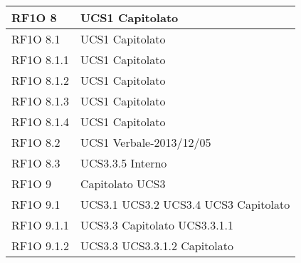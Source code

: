 \begin{center}
\begin{longtable}{ | p{5cm} | p{5cm} |}
        RF1O 8  &  UCS1 \newline  Capitolato \newline  \\ \hline      
        RF1O 8.1  &  UCS1 \newline  Capitolato \newline  \\ \hline      
        RF1O 8.1.1  &  UCS1 \newline  Capitolato \newline  \\ \hline      
        RF1O 8.1.2 &  UCS1 \newline  Capitolato \newline  \\ \hline      
        RF1O 8.1.3  &  UCS1 \newline  Capitolato \newline  \\ \hline      
        RF1O 8.1.4  &  UCS1 \newline  Capitolato \newline  \\ \hline      
        RF1O 8.2  &  UCS1 \newline  Verbale-2013/12/05 \newline  \\ \hline      
        RF1O 8.3 &  UCS3.3.5 \newline  Interno \newline  \\ \hline      
        RF1O 9  &  Capitolato \newline  UCS3 \newline  \\ \hline      
        RF1O 9.1  &  UCS3.1 \newline  UCS3.2 \newline  UCS3.4 \newline  UCS3 \newline  Capitolato \newline  \\ \hline      
        RF1O 9.1.1  &  UCS3.3 \newline  Capitolato \newline  UCS3.3.1.1 \newline  \\ \hline      
        RF1O 9.1.2  &  UCS3.3 \newline  UCS3.3.1.2 \newline  Capitolato \newline  \\ \hline      

\end{longtable}
\end{center}
